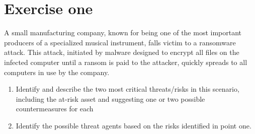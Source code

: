 \section{Exercise one}

A small manufacturing company, known for being one of the most important producers of a specialized musical instrument, falls victim to a ransomware attack. 
This attack, initiated by malware designed to encrypt all files on the infected computer until a ransom is paid to the attacker, quickly spreads to all computers in use by the company.
\begin{enumerate}
    \item Identify and describe the two most critical threats/risks in this scenario, including the at-risk asset and suggesting one or two possible countermeasures for each
    \item Identify the possible threat agents based on the risks identified in point one.
\end{enumerate}

